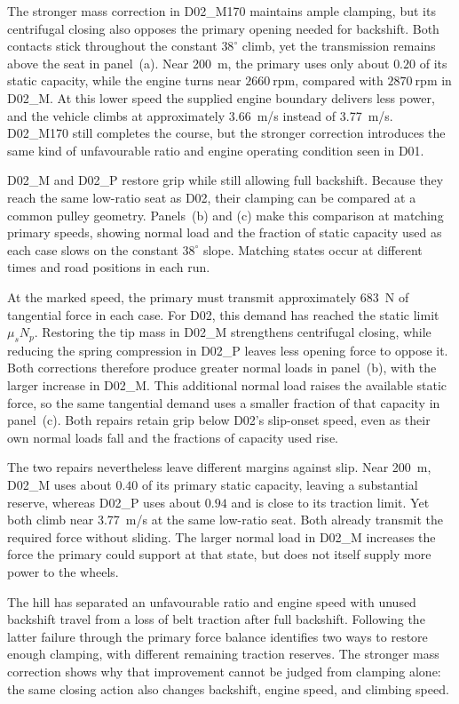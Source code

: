 \documentclass[11pt]{report}
\numberwithin{equation}{section}
\begin{document}
The stronger mass correction in D02\_M170 maintains ample clamping, but its
centrifugal closing also opposes the primary opening needed for backshift.
Both contacts stick throughout the constant \(38^\circ\) climb, yet the
transmission remains above the seat in panel~(a). Near \SI{200}{m}, the
primary uses only about \(0.20\) of its static capacity, while the engine
turns near \(2660~\mathrm{rpm}\), compared with \(2870~\mathrm{rpm}\) in
D02\_M. At this lower speed the supplied engine boundary delivers less power,
and the vehicle climbs at approximately \SI{3.66}{m/s} instead of
\SI{3.77}{m/s}. D02\_M170 still completes the course, but the stronger correction
introduces the same kind of unfavourable ratio and engine operating condition
seen in D01.

D02\_M and D02\_P restore grip while still allowing full backshift.
Because they reach the same low-ratio seat as D02, their clamping can be
compared at a common pulley geometry. Panels~(b) and (c) make this comparison
at matching primary speeds, showing normal load and the fraction of static
capacity used as each case slows on the constant \(38^\circ\) slope.
Matching states occur at different times and road positions in each run.

At the marked speed, the primary must transmit approximately \SI{683}{N}
of tangential force in each case. For D02, this demand has reached the
static limit \(\mu_sN_p\). Restoring the tip mass in D02\_M strengthens
centrifugal closing, while reducing the spring compression in D02\_P leaves
less opening force to oppose it. Both corrections therefore produce greater
normal loads in panel~(b), with the larger increase in D02\_M. This additional
normal load raises the available static force, so the same tangential demand
uses a smaller fraction of that capacity in panel~(c). Both repairs retain
grip below D02's slip-onset speed, even as their own normal loads fall and
the fractions of capacity used rise.

The two repairs nevertheless leave different margins against slip. Near
\SI{200}{m}, D02\_M uses about \(0.40\) of its primary static capacity,
leaving a substantial reserve, whereas D02\_P uses about \(0.94\) and is
close to its traction limit. Yet both climb near \SI{3.77}{m/s} at the same
low-ratio seat. Both already transmit the required force without sliding.
The larger normal load in D02\_M increases the force the primary could
support at that state, but does not itself supply more power to the wheels.

The hill has separated an unfavourable ratio and engine speed with unused
backshift travel from a loss of belt traction after full backshift. Following
the latter failure through the primary force balance identifies two ways to
restore enough clamping, with different remaining traction reserves. The
stronger mass correction shows why that improvement cannot be judged from
clamping alone: the same closing action also changes backshift, engine speed,
and climbing speed.
\end{document}

